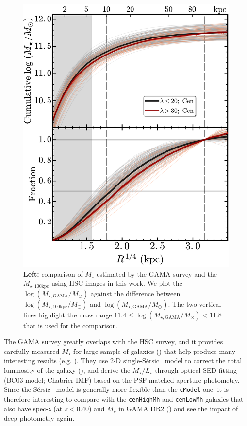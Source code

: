 \documentclass[a4paper,fleqn,usenatbib]{mnras}
\def\ser{{S\'{e}rsic\ }}
\def\rbcg{\texttt{cenHighMh}}
\def\nbcg{\texttt{cenLowMh}}
\def\mstar{{$M_{\star}$}}
\def\mtot{{$M_{\star,100\mathrm{kpc}}$}}
\def\logmtot{{$\log (M_{\star,100\mathrm{kpc}}/M_{\odot})$}}
\def\logmgama{{$\log (M_{\star,\mathrm{GAMA}}/M_{\odot})$}}
\def\m2l{{$M_{\star}/L_{\star}$}}
\begin{document}
\begin{figure}
    \centering
    \includegraphics[width=\columnwidth]{fig/redbcg_prof_m100D}
    \caption{
        \textbf{Left:} comparison of \mstar{} estimated by the GAMA survey and 
        the \mtot{} using HSC images in this work. 
        We plot the \logmgama{} against the difference between \logmtot{} and \logmgama{}. 
        The two vertical lines highlight the mass range $11.4 \leq$\logmgama{}$<11.8$ 
        that is used for the comparison.
        }
    \label{fig:cog}
\end{figure}
    
    The GAMA survey greatly overlaps with the HSC survey, and it provides carefully 
    measured \mstar{} for large sample of galaxies (\citealt{Taylor2011}) that help 
    produce many interesting results (e.g. \citealt{Bauer2013, Ferreras2017}).
    They use 2-D single-\ser{} model to correct the total luminosity of the galaxy 
    (\citealt{Kelvin2012}), and derive the \m2l{} through optical-SED fitting 
    (BC03 model; Chabrier IMF) based on the PSF-matched aperture photometry. 
    Since the \ser{} model is generally more flexible than the \texttt{cModel} one, 
    it is therefore interesting to compare with the \rbcg{} and \nbcg{} galaxies 
    that also have spec-$z$ (at $z < 0.40$) and \mstar{} in GAMA DR2 
    (\citealt{Liske2015}) and see the impact of deep photometry again. 
    
\end{document}
